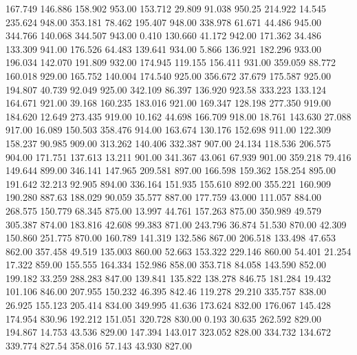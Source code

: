  167.749  146.886  158.902       953.00
 153.712   29.809   91.038       950.25
 214.922   14.545  235.624       948.00
 353.181   78.462  195.407       948.00
 338.978   61.671   44.486       945.00
 344.766  140.068  344.507       943.00
   0.410  130.660   41.172       942.00
 171.362   34.486  133.309       941.00
 176.526   64.483  139.641       934.00
   5.866  136.921  182.296       933.00
 196.034  142.070  191.809       932.00
 174.945  119.155  156.411       931.00
 359.059   88.772  160.018       929.00
 165.752  140.004  174.540       925.00
 356.672   37.679  175.587       925.00
 194.807   40.739   92.049       925.00
 342.109   86.397  136.920       923.58
 333.223  133.124  164.671       921.00
  39.168  160.235  183.016       921.00
 169.347  128.198  277.350       919.00
 184.620   12.649  273.435       919.00
  10.162   44.698  166.709       918.00
  18.761  143.630   27.088       917.00
  16.089  150.503  358.476       914.00
 163.674  130.176  152.698       911.00
 122.309  158.237   90.985       909.00
 313.262  140.406  332.387       907.00
  24.134  118.536  206.575       904.00
 171.751  137.613   13.211       901.00
 341.367   43.061   67.939       901.00
 359.218   79.416  149.644       899.00
 346.141  147.965  209.581       897.00
 166.598  159.362  158.254       895.00
 191.642   32.213   92.905       894.00
 336.164  151.935  155.610       892.00
 355.221  160.909  190.280       887.63
 188.029   90.059   35.577       887.00
 177.759   43.000  111.057       884.00
 268.575  150.779   68.345       875.00
  13.997   44.761  157.263       875.00
 350.989   49.579  305.387       874.00
 183.816   42.608   99.383       871.00
 243.796   36.874   51.530       870.00
  42.309  150.860  251.775       870.00
 160.789  141.319  132.586       867.00
 206.518  133.498   47.653       862.00
 357.458   49.519  135.003       860.00
  52.663  153.322  229.146       860.00
  54.401   21.254   17.322       859.00
 155.555  164.334  152.986       858.00
 353.718   84.058  143.590       852.00
 199.182   33.259  288.283       847.00
 139.841  135.822  138.278       846.75
 181.284   19.432  101.106       846.00
 207.955  150.232   46.395       842.46
 119.278   29.210  335.757       838.00
  26.925  155.123  205.414       834.00
 349.995   41.636  173.624       832.00
 176.067  145.428  174.954       830.96
 192.212  151.051  320.728       830.00
   0.193   30.635  262.592       829.00
 194.867   14.753   43.536       829.00
 147.394  143.017  323.052       828.00
 334.732  134.672  339.774       827.54
 358.016   57.143   43.930       827.00
